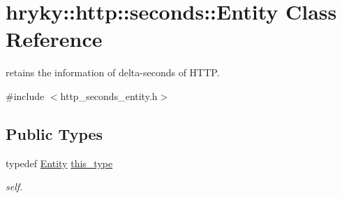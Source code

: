 \hypertarget{classhryky_1_1http_1_1seconds_1_1_entity}{\section{hryky\-:\-:http\-:\-:seconds\-:\-:Entity Class Reference}
\label{classhryky_1_1http_1_1seconds_1_1_entity}
}


retains the information of delta-\/seconds of H\-T\-T\-P.  




{\ttfamily \#include $<$http\-\_\-seconds\-\_\-entity.\-h$>$}

\subsection*{Public Types}
\begin{DoxyCompactItemize}
\item 
\hypertarget{classhryky_1_1http_1_1seconds_1_1_entity_a1a69109f5c7e9998e36e4a6eae23d74d}{typedef \hyperlink{classhryky_1_1http_1_1seconds_1_1_entity}{Entity} \hyperlink{classhryky_1_1http_1_1seconds_1_1_entity_a1a69109f5c7e9998e36e4a6eae23d74d}{this\-\_\-type}}\label{classhryky_1_1http_1_1seconds_1_1_entity_a1a69109f5c7e9998e36e4a6eae23d74d}

\begin{DoxyCompactList}\small\item\em self. \end{DoxyCompactList}\end{DoxyCompactItemize}
